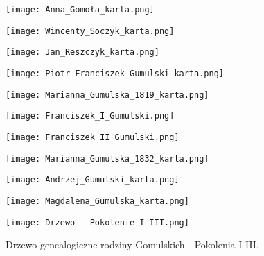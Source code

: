 \begin{figure}[!ht]
    \vspace*{0.5cm}
    \centering \texttt{[image: 
        Anna\_Gomoła\_karta.png]}
\end{figure}

\begin{figure}[!ht]
    \vspace*{0.5cm}
    \centering \texttt{[image: 
        Wincenty\_Soczyk\_karta.png]}
\end{figure}

\begin{figure}[!ht]
    \vspace*{0.5cm}
    \centering \texttt{[image: 
        Jan\_Reszczyk\_karta.png]}
\end{figure}

\begin{figure}[!ht]
    \vspace*{0.5cm}
    \centering \texttt{[image: 
        Piotr\_Franciszek\_Gumulski\_karta.png]}
\end{figure}

\begin{figure}[!ht]
    \vspace*{0.5cm}
    \centering \texttt{[image: 
        Marianna\_Gumulska\_1819\_karta.png]}
\end{figure}

\begin{figure}[!ht]
    \vspace*{0.5cm}
    \centering \texttt{[image: 
        Franciszek\_I\_Gumulski.png]}
\end{figure}

\begin{figure}[!ht]
    \vspace*{0.5cm}
    \centering \texttt{[image: 
        Franciszek\_II\_Gumulski.png]}
\end{figure}

\begin{figure}[!ht]
    \vspace*{0.5cm}
    \centering \texttt{[image: 
        Marianna\_Gumulska\_1832\_karta.png]}
\end{figure}

\begin{figure}[!ht]
    \vspace*{0.5cm}
    \centering \texttt{[image: 
        Andrzej\_Gumulski\_karta.png]}
\end{figure}

\begin{figure}[!ht]
    \vspace*{0.5cm}
    \centering \texttt{[image: 
        Magdalena\_Gumulska\_karta.png]}
\end{figure}

\begin{sidewaysfigure}
    \centering \texttt{[image: 
        Drzewo - Pokolenie I-III.png]}
    \captionsetup{format=hang}
    \caption{Drzewo genealogiczne rodziny Gomulskich - Pokolenia I-III.}
\end{sidewaysfigure}